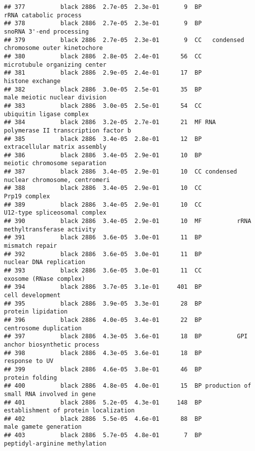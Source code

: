 \documentclass[]{article}
\begin{document}
\begin{verbatim}
## 377          black 2886  2.7e-05  2.3e-01       9  BP                   rRNA catabolic process
## 378          black 2886  2.7e-05  2.3e-01       9  BP                 snoRNA 3'-end processing
## 379          black 2886  2.7e-05  2.3e-01       9  CC   condensed chromosome outer kinetochore
## 380          black 2886  2.8e-05  2.4e-01      56  CC            microtubule organizing center
## 381          black 2886  2.9e-05  2.4e-01      17  BP                         histone exchange
## 382          black 2886  3.0e-05  2.5e-01      35  BP            male meiotic nuclear division
## 383          black 2886  3.0e-05  2.5e-01      54  CC                 ubiquitin ligase complex
## 384          black 2886  3.2e-05  2.7e-01      21  MF RNA polymerase II transcription factor b
## 385          black 2886  3.4e-05  2.8e-01      12  BP            extracellular matrix assembly
## 386          black 2886  3.4e-05  2.9e-01      10  BP            meiotic chromosome separation
## 387          black 2886  3.4e-05  2.9e-01      10  CC condensed nuclear chromosome, centromeri
## 388          black 2886  3.4e-05  2.9e-01      10  CC                            Prp19 complex
## 389          black 2886  3.4e-05  2.9e-01      10  CC            U12-type spliceosomal complex
## 390          black 2886  3.4e-05  2.9e-01      10  MF          rRNA methyltransferase activity
## 391          black 2886  3.6e-05  3.0e-01      11  BP                          mismatch repair
## 392          black 2886  3.6e-05  3.0e-01      11  BP                  nuclear DNA replication
## 393          black 2886  3.6e-05  3.0e-01      11  CC                  exosome (RNase complex)
## 394          black 2886  3.7e-05  3.1e-01     401  BP                         cell development
## 395          black 2886  3.9e-05  3.3e-01      28  BP                       protein lipidation
## 396          black 2886  4.0e-05  3.4e-01      22  BP                   centrosome duplication
## 397          black 2886  4.3e-05  3.6e-01      18  BP          GPI anchor biosynthetic process
## 398          black 2886  4.3e-05  3.6e-01      18  BP                           response to UV
## 399          black 2886  4.6e-05  3.8e-01      46  BP                          protein folding
## 400          black 2886  4.8e-05  4.0e-01      15  BP production of small RNA involved in gene
## 401          black 2886  5.2e-05  4.3e-01     148  BP    establishment of protein localization
## 402          black 2886  5.5e-05  4.6e-01      88  BP                   male gamete generation
## 403          black 2886  5.7e-05  4.8e-01       7  BP            peptidyl-arginine methylation

\end{verbatim}
\end{document}
